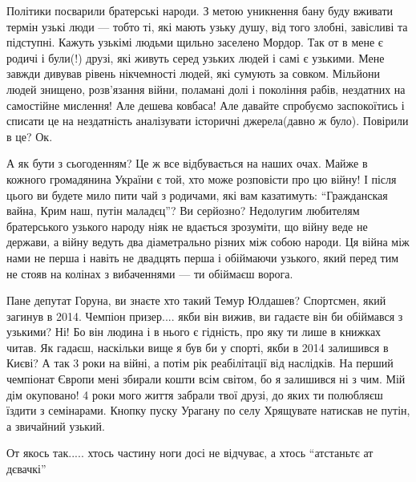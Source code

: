 Політики посварили братерські народи. З метою уникнення бану буду вживати
термін узькі люди — тобто ті, які мають узьку душу, від того злобні, завісливі та
підступні. Кажуть узькімі людьми щильно заселено Мордор. Так от в мене є родичі
і були(!)  друзі, які живуть серед узьких людей і самі є узькими. Мене завжди
дивував рівень нікчемності людей, які сумують за совком. Мільйони людей знищено,
розв’язання війни, поламані долі і покоління рабів, нездатних на самостійне
мислення! Але дешева ковбаса! Але давайте спробуємо заспокоїтись і списати це
на нездатність аналізувати історичні джерела(давно ж було). Повірили в це? Ок.

А як бути з сьогоденням? Це ж все відбувається на наших очах. Майже в кожного
громадянина України є той, хто може розповісти про цю війну! І після цього ви
будете мило пити чай з родичами, які вам казатимуть: \enquote{Гражданская
вайна, Крим наш, путін маладєц}? Ви серйозно? Недолугим любителям братерського
узького народу ніяк не вдається зрозуміти, що війну веде не держави, а війну
ведуть два діаметрально різних між собою народи. Ця війна між нами не перша і
навіть не двадцять перша і обіймаючи узького, який перед тим не стояв на
колінах з вибаченнями — ти обіймаєш ворога. 

Пане депутат Горуна, ви знаєте хто такий Темур Юлдашев? Спортсмен, який загинув
в 2014. Чемпіон призер.... якби він вижив, ви гадаєте він би обіймався з
узькими? Ні! Бо він людина і в нього є гідність, про яку ти лише в книжках
читав. Як гадаєш, наскільки вище я був би у спорті, якби в 2014 залишився в
Києві? А так 3 роки на війні, а потім рік реабілітації від наслідків. На перший
чемпіонат Європи мені збирали кошти всім світом, бо я залишився ні з чим. Мій
дім окуповано! 4 роки мого життя забрали твої друзі, до яких ти полюбляєш
їздити з семінарами. Кнопку пуску Урагану по селу Хрящувате натискав не путін, а
звичайний узький.

От якось так..... хтось частину ноги досі не відчуває, а хтось \enquote{атстаньтє ат дєвачкі}

